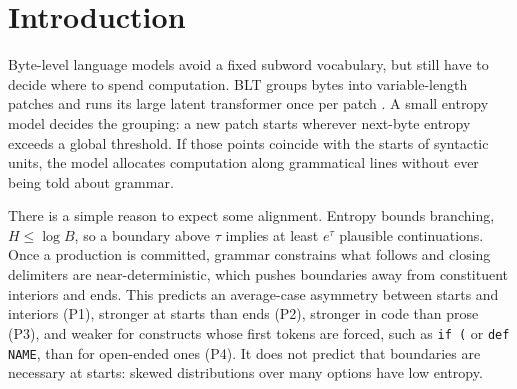\begin{abstract}
The Byte Latent Transformer (BLT) spends latent computation per patch, and opens a new patch where a small byte-level model is uncertain. We ask whether these entropy-triggered boundaries align with the starts of syntactic constituents beyond a density-matched null, in Python, C++, and English prose. Using the released patcher with its 512-byte sliding window restored, one-to-one matching, a tolerance frozen on a calibration split, and \nPerm{} permutations of each file's own patch lengths, held-out start F1 \POnePy{} the null in Python (\FonePy{} vs.\ \FoneNullPy{}), \POneCpp{} it in C++ (\FoneCpp{} vs.\ \FoneNullCpp{}), and \POneEn{} it in English (\FoneEn{} vs.\ \FoneNullEn{}). Against the strongest structure-blind baseline, BLT \RTwoPy{} it in Python and \RTwoCpp{} it in C++. For C++ regions containing memory-unsafe operations, a fixed-effects regression that conditions on identifier entropy and share finds \OFive{} in boundary density. Entropy is a surface statistic; none of these results is evidence of semantic understanding.
\end{abstract}

\section{Introduction}
Byte-level language models avoid a fixed subword vocabulary, but still have to decide where to spend computation. BLT groups bytes into variable-length patches and runs its large latent transformer once per patch \citep{pagnoni-etal-2025-byte}. A small entropy model decides the grouping: a new patch starts wherever next-byte entropy exceeds a global threshold. If those points coincide with the starts of syntactic units, the model allocates computation along grammatical lines without ever being told about grammar.

There is a simple reason to expect some alignment. Entropy bounds branching, $H \le \log B$, so a boundary above $\tau$ implies at least $e^\tau$ plausible continuations. Once a production is committed, grammar constrains what follows and closing delimiters are near-deterministic, which pushes boundaries away from constituent interiors and ends. This predicts an average-case asymmetry between starts and interiors (P1), stronger at starts than ends (P2), stronger in code than prose (P3), and weaker for constructs whose first tokens are forced, such as \texttt{if (} or \texttt{def NAME}, than for open-ended ones (P4). It does not predict that boundaries are necessary at starts: skewed distributions over many options have low entropy.

